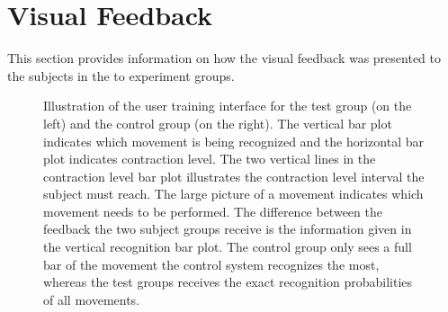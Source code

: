 %
\section{Visual Feedback}
This section provides information on how the visual feedback was presented to the subjects in the to experiment groups.

\begin{figure}[H] 
\centering
	\caption{Illustration of the user training interface for the test group (on the left) and the control group (on the right). The vertical bar plot indicates which movement is being recognized and the horizontal bar plot indicates contraction level. The two vertical lines in the contraction level bar plot illustrates the contraction level interval the subject must reach. The large picture of a movement indicates which movement needs to be performed. The difference between the feedback the two subject groups receive is the information given in the vertical recognition bar plot. The control group only sees a full bar of the movement the control system recognizes the most, whereas the test groups receives the exact recognition probabilities of all movements.}
    \label{fig:feedbackGUI}
\end{figure}

